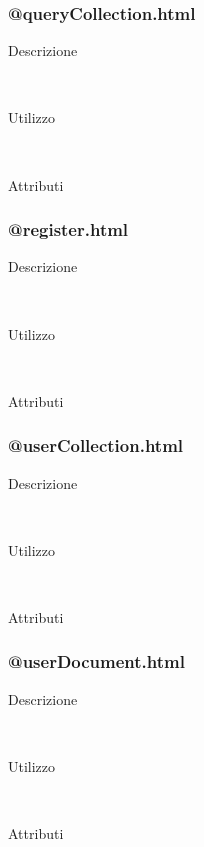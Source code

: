 \subsubsection{@queryCollection.html}
\begin{description}
	\item[Descrizione] \hfill \\
	
	\item[Utilizzo] \hfill \\
	
	\item[Attributi] \hfill
 	
\end{description}

\subsubsection{@register.html}
\begin{description}
	\item[Descrizione] \hfill \\
	
	\item[Utilizzo] \hfill \\
	
	\item[Attributi] \hfill
 	
\end{description}

\subsubsection{@userCollection.html}
\begin{description}
	\item[Descrizione] \hfill \\
	
	\item[Utilizzo] \hfill \\
	
	\item[Attributi] \hfill

\end{description}

\subsubsection{@userDocument.html}
\begin{description}
	\item[Descrizione] \hfill \\
	
	\item[Utilizzo] \hfill \\
	
	\item[Attributi] \hfill
 	
\end{description}

